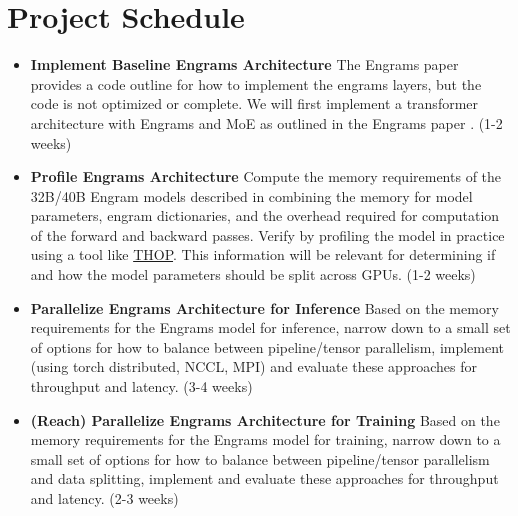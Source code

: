 \documentclass{article}
\begin{document}
\section{Project Schedule}
\begin{itemize}
    \item \textbf{Implement Baseline Engrams Architecture} The Engrams paper provides a code outline for how to implement the engrams layers, but the code is not optimized or complete. We will first implement a transformer architecture with Engrams and MoE as outlined in the Engrams paper \cite{cheng_conditional_2026}. (1-2 weeks)

    \item \textbf{Profile Engrams Architecture} Compute the memory requirements of the 32B/40B Engram models described in \cite{cheng_conditional_2026} combining the memory for model parameters, engram dictionaries, and the overhead required for computation of the forward and backward passes. Verify by profiling the model in practice using a tool like \href{https://github.com/ultralytics/thop}{THOP}. This information will be relevant for determining if and how the model parameters should be split across GPUs. (1-2 weeks)

    \item \textbf{Parallelize Engrams Architecture for Inference} Based on the memory requirements for the Engrams model for inference, narrow down to a small set of options for how to balance between pipeline/tensor parallelism, implement (using torch distributed, NCCL, MPI) and evaluate these approaches for throughput and latency. (3-4 weeks)

    \item \textbf{(Reach) Parallelize Engrams Architecture for Training} Based on the memory requirements for the Engrams model for training, narrow down to a small set of options for how to balance between pipeline/tensor parallelism and data splitting, implement and evaluate these approaches for throughput and latency. (2-3 weeks)

    
\end{itemize}
\end{document}
